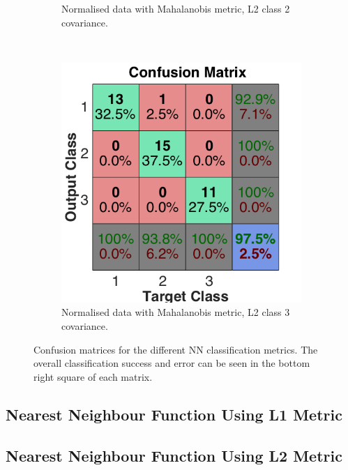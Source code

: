 \documentclass[a4paper, 10pt, conference]{ieeeconf}
\begin{document}
\begin{figure}[!ht]
\begin{subfigure}{0.32\textwidth}
      \caption{Normalised data with Mahalanobis metric, L2 class 2 covariance.}
    \end{subfigure}
    ~
    \begin{subfigure}{0.32\textwidth}
      \includegraphics[width=\textwidth]{pic/mod_cov_l2_class3.png}
      \caption{Normalised data with Mahalanobis metric, L2 class 3 covariance.}
    \end{subfigure}
	\caption{Confusion matrices for the different NN classification metrics. The overall classification success and error can be seen in the bottom right square of each matrix. }
  \label{fig:nnconfusemod}
\end{figure}
\newpage

\subsection*{Nearest Neighbour Function Using L1 Metric}


\subsection*{Nearest Neighbour Function Using L2 Metric}

\newpage
\end{document}
